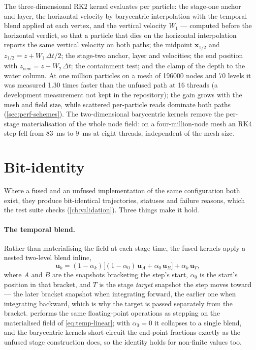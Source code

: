 The three-dimensional RK2 kernel evaluates per particle: the stage-one anchor and layer, the
horizontal velocity by barycentric interpolation with the temporal blend applied at each vertex, and
the vertical velocity $W_1$ --- computed before the horizontal verdict, so that a particle that dies
on the horizontal interpolation reports the same vertical velocity on both paths; the midpoint
$\mathbf{x}_{1/2}$ and $z_{1/2}=z+W_1\,\Delta t/2$; the stage-two anchor, layer and velocities; the end
position with $z_{\text{new}}=z+W_2\,\Delta t$; the containment test; and the clamp of the depth to the
water column. At one million particles on a mesh of \num{196000} nodes and 70 levels it was measured
1.30 times faster than the unfused path at 16 threads (a development measurement not kept in the
repository); the gain grows with the mesh and field size, while
scattered per-particle reads dominate both paths (\cref{sec:perf-schemes}). The two-dimensional
barycentric kernels remove the per-stage materialisation of the whole node field: on a
four-million-node mesh an RK4 step fell from \SI{83}{ms} to \SI{9}{ms} at eight threads, independent of
the mesh size.

\section{Bit-identity}\label{sec:fused-identity}

Where a fused and an unfused implementation of the same configuration both exist, they produce
bit-identical trajectories, statuses and failure reasons, which the test suite checks
(\cref{ch:validation}). Three things make it hold.

\paragraph{The temporal blend.} Rather than materialising the field at each stage time, the fused
kernels apply a nested two-level blend inline,
\begin{equation}\label{eq:fused-nested}
  \mathbf{u}_k=(1-\alpha_k)\bigl[(1-\alpha_0)\,\mathbf{u}_A+\alpha_0\,\mathbf{u}_B\bigr]+\alpha_k\,\mathbf{u}_T ,
\end{equation}
where $A$ and $B$ are the snapshots bracketing the step's start, $\alpha_0$ is the start's position in
that bracket, and $T$ is the stage \emph{target} snapshot the step moves toward --- the later bracket
snapshot when integrating forward, the earlier one when integrating backward, which is why the target
is passed separately from the bracket.  performs the same floating-point
operations as stepping on the materialised field of \cref{eq:temp-linear}; with $\alpha_0=0$ it
collapses to a single blend, and the barycentric kernels short-circuit the end-point fractions exactly
as the unfused stage construction does, so the identity holds for non-finite values too.

